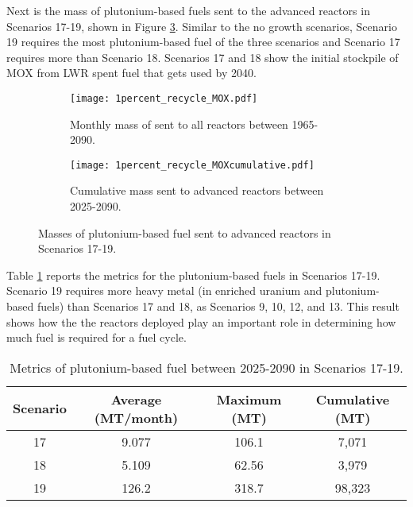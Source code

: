 Next is the mass of plutonium-based fuels sent to the advanced reactors 
in Scenarios 17-19, shown in Figure \ref{fig:1percent_recycle_mox}.
Similar to the no growth scenarios, Scenario 19 requires the most 
plutonium-based fuel of the three scenarios and Scenario 17 
requires more than Scenario 18. Scenarios 17 and 18 show the 
initial stockpile of \gls{MOX} from \gls{LWR} spent fuel that 
gets used by 2040. 

\begin{figure}[h!]
    \centering
    \begin{subfigure}[b]{0.45\textwidth}
        \centering
        \texttt{[image: 1percent\_recycle\_MOX.pdf]}
        \caption{Monthly mass of sent to all reactors 
        between 1965-2090.}
        \label{fig:1percent_recycle_AR_mox}
    \end{subfigure}
    \hfill
    \begin{subfigure}[b]{0.45\textwidth}
        \centering
        \texttt{[image: 1percent\_recycle\_MOXcumulative.pdf]}
        \caption{Cumulative mass  
        sent to advanced reactors between 2025-2090.}
        \label{fig:1percent_recycle_mox_cumulative}
    \end{subfigure}
       \caption{Masses of plutonium-based fuel sent to advanced reactors
        in Scenarios 17-19.}
       \label{fig:1percent_recycle_mox}
\end{figure}

Table \ref{tab:s17-19_mox} reports the metrics for the plutonium-based 
fuels in Scenarios 17-19. Scenario 19 requires more heavy metal (in enriched 
uranium and plutonium-based fuels) than Scenarios 
17 and 18, as Scenarios 9, 10, 12, and 13. This result shows how the 
the reactors deployed play an important role in determining how 
much fuel is required for a fuel cycle.  

\begin{table}[h!]
    \centering 
    \caption{Metrics of plutonium-based fuel between 2025-2090 in Scenarios 
    17-19.}
    \label{tab:s17-19_mox}
    \begin{tabular}{c c c c}
        \hline 
        Scenario & Average (MT/month) & Maximum (MT) & Cumulative (MT) \\
        \hline
        17 & 9.077 & 106.1 & 7,071\\
        18 & 5.109 & 62.56 & 3,979\\
        19 & 126.2 & 318.7 & 98,323\\
        \hline
    \end{tabular}
\end{table}

